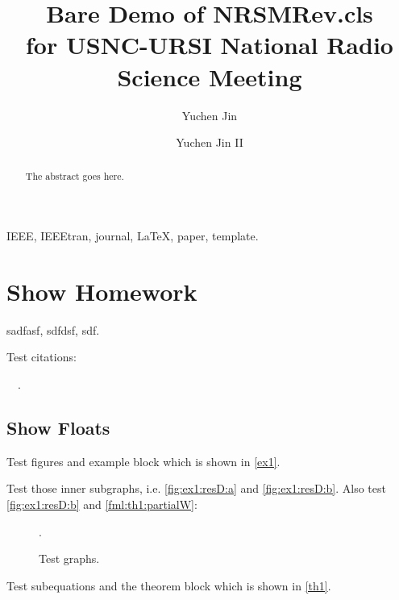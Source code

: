 \documentclass[color,hyper]{NRSMRev}
\title{%
  \texorpdfstring{%
    Bare Demo of NRSMRev.cls\\ for USNC-URSI National Radio Science Meeting%
  }{%
    Bare Demo of NRSMRev.cls for USNC-URSI National Radio Science Meeting%
  }%
}
\author[org1]{Yuchen Jin}
\author[org1]{Yuchen Jin II}
\begin{document}
\maketitle

\begin{abstract}
  The abstract goes here.
\end{abstract}

\begin{IEEEkeywords}
  IEEE, IEEEtran, journal, \LaTeX, paper, template.
\end{IEEEkeywords}

\section{Show Homework}
sadfasf, sdfdsf, sdf.

Test citations:

\cite{Zeiler5539957}~\cite{Yang6175956}~\cite{Dong7115171}.

\subsection{Show Floats}

Test figures and example block which is shown in \autoref{ex1}.

\begin{example} \label{ex1}
  Test those inner subgraphs, i.e. \autoref{fig:ex1:resD:a} and \autoref{fig:ex1:resD:b}. Also test \ref{fig:ex1:resD:b} and \eqref{fml:th1:partialW}:
  
  \begin{figure}[H] \label{fig:ex1:resD}
		\centering
		\begin{minipage}[b]{0.48\columnwidth}
			\centering
		\end{minipage}
		\begin{minipage}[b]{0.48\columnwidth}
			\centering
		\end{minipage}
		\DeclareGraphicsExtensions.
		\caption{Test graphs.}
	\end{figure}
	
	\qED
	
\end{example}

Test subequations and the theorem block which is shown in \autoref{th1}.
\end{document}
